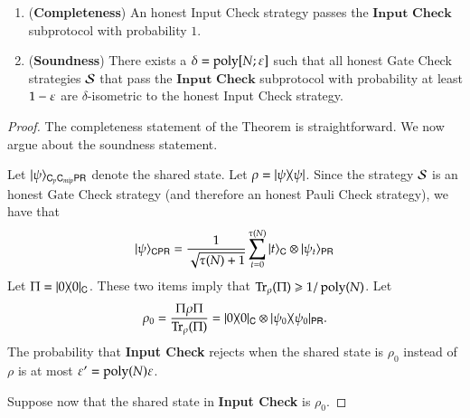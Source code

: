 \begin{lemma}	
\label{lem:input_check}
\leavevmode
\begin{enumerate}
	\item (\textbf{Completeness}) An honest Input Check strategy passes the $\textbf{Input Check}$ subprotocol with probability $1$. 
	\item (\textbf{Soundness}) There exists a $\delta = \operatorname{poly}[N;\varepsilon]$ such that all honest Gate Check strategies $\mathcal{S}$ that pass the $\textbf{Input Check}$ subprotocol with probability at least $1 - \varepsilon$ are $\delta$-isometric to the honest Input Check strategy.
\end{enumerate}
\end{lemma}
\begin{proof}
The completeness statement of the Theorem is straightforward. We now argue about the soundness statement.

Let $|\psi\rangle_{{\mathsf{C}}_p {\mathsf{C}}_{mip} {\mathsf{P}} {\mathsf{R}}}$ denote the shared state. Let $\rho = |\psi\rangle\! \langle \psi|$. Since the strategy $\mathcal{S}$ is an honest Gate Check strategy (and therefore an honest Pauli Check strategy), we have that
\[
|\psi\rangle_{{\mathsf{C}}{\mathsf{P}} {\mathsf{R}}} = \frac{1}{\sqrt{\tau(N)+1}} \sum_{t = 0}^{\tau(N)} |t\rangle_{{\mathsf{C}}} \otimes |\psi_t\rangle_{{\mathsf{P}} {\mathsf{R}}}
\]
Let $\Pi = |0\rangle\! \langle 0|_{{\mathsf{C}}}$. These two items imply that $\operatorname{Tr}_\rho (\Pi) \geqslant 1/\operatorname{poly}(N)$. Let 
\[
	\rho_{0} = \frac{\Pi \rho \Pi}{\operatorname{Tr}_\rho (\Pi)} = |0\rangle\! \langle 0|_{{\mathsf{C}}} \otimes |\psi_0\rangle\! \langle \psi_0|_{{\mathsf{P}} {\mathsf{R}}}.
\]
The probability that \textbf{Input Check} rejects when the shared state is $\rho_{0}$ instead of $\rho$ is at most $\varepsilon' = \operatorname{poly}(N) \varepsilon$. 

Suppose now that the shared state in \textbf{Input Check} is $\rho_{0}$. 


\end{proof}

